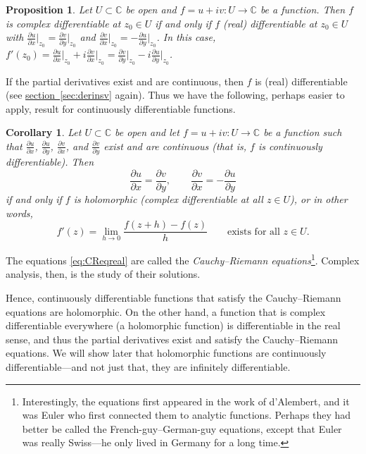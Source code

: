 \documentclass[12pt,openany]{book}
\newcommand{\C}{{\mathbb{C}}}
\newcommand{\myindex}[1]{#1\index{#1}}
\theoremstyle{plain}
\newtheorem{prop}[thm]{Proposition}
\newtheorem{cor}[thm]{Corollary}
\theoremstyle{remark}
\theoremstyle{definition}
\theoremstyle{exercise}
\theoremstyle{example}
\newcommand{\sectionref}[1]{\hyperref[#1]{section~\ref*{#1}}}
\begin{document}
\begin{prop}
Let $U \subset \C$ be open and $f = u+iv \colon U \to \C$ be a function.
Then
$f$ is complex differentiable at $z_0 \in U$
if and only if
$f$ (real) differentiable at $z_0 \in U$
with
$\frac{\partial u}{\partial x}\big|_{z_0} =
\frac{\partial v}{\partial y}\big|_{z_0}$
and
$\frac{\partial v}{\partial x}\big|_{z_0} =
-\frac{\partial u}{\partial y}\big|_{z_0}$.
In this case,
$f'(z_0) = 
\frac{\partial u}{\partial x}\big|_{z_0} + i \frac{\partial v}{\partial
x}\big|_{z_0} = \frac{\partial v}{\partial y}\big|_{z_0} - i \frac{\partial
u}{\partial y}\big|_{z_0}$.
\end{prop}

If the partial derivatives exist and are continuous, then $f$ is
(real) differentiable (see \sectionref{sec:derinsv} again).
Thus we have the following, perhaps easier to apply, result
for continuously differentiable functions.

\begin{cor}
Let $U \subset \C$ be open and let $f = u+iv \colon U \to \C$ be a function
such that $\frac{\partial u}{\partial x}$, $\frac{\partial u}{\partial y}$, $\frac{\partial
v}{\partial x}$, and $\frac{\partial v}{\partial y}$ exist and are continuous (that is,
$f$ is continuously differentiable).
Then
\begin{equation} \label{eq:CReqreal}
\frac{\partial u}{\partial x} = \frac{\partial v}{\partial y} , \qquad
\frac{\partial v}{\partial x} = -\frac{\partial u}{\partial y}
\end{equation}
if and only if $f$ is holomorphic (complex differentiable at all $z \in U$),
or in other words,
\begin{equation*}
f'(z) =
\lim_{h \to 0} \frac{f(z+h) - f(z)}{h}
\qquad
\text{exists for all $z \in U$.}
\end{equation*}
\end{cor}

The equations \eqref{eq:CReqreal} are called the
\emph{\myindex{Cauchy--Riemann equations}}\footnote{Interestingly,
the equations first appeared in the work of d'Alembert, and
it was Euler who first connected them to analytic functions.
Perhaps they had better be called the French-guy--German-guy equations,
except that Euler was really Swiss---he only lived in Germany for a long time.}.
Complex analysis, then, is the study of their solutions.

Hence, continuously differentiable functions that satisfy
the Cauchy--Riemann equations are holomorphic.
On the other hand,
a function that is complex differentiable everywhere (a holomorphic
function) is differentiable in the real sense,
and thus the partial derivatives exist and satisfy the Cauchy--Riemann
equations.  We will show later that holomorphic functions are
continuously differentiable---and not just that, they are
infinitely differentiable.
\end{document}
